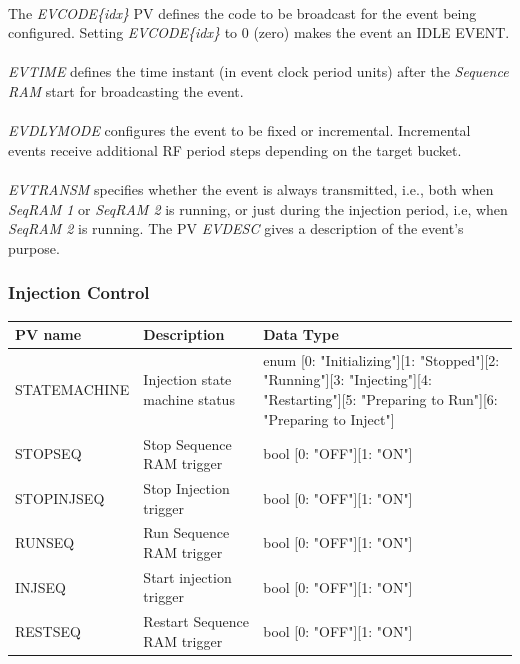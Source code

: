\documentclass[openany]{article}
\begin{document}
			\paragraph{} The \emph{EVCODE\{idx\}} PV defines the code to be broadcast for the event being configured. Setting \emph{EVCODE\{idx\}} to 0 (zero) makes the event an IDLE EVENT.
			\paragraph{} \emph{EVTIME} defines the time instant (in event clock period units) after the \emph{Sequence RAM} start for broadcasting the event.
			\paragraph{} \emph{EVDLYMODE} configures the event to be fixed or incremental. Incremental events receive additional RF period steps depending on the target bucket.
			\paragraph{} \emph{EVTRANSM} specifies whether the event is always transmitted, i.e., both when \emph{SeqRAM 1} or \emph{SeqRAM 2} is running, or just during the injection period, i.e, when \emph{SeqRAM 2} is running. The PV \emph{EVDESC} gives a description of the event's purpose.

		\subsubsection{Injection Control}\label{pvgroup:evg-injection}
			\begin{center}
			\begin{tabular}{| m{2.8cm} m{6cm} m{6cm} |}
			    \hline
			    \bfseries PV name & \bfseries Description & \bfseries Data Type \\ \hline
			    STATEMACHINE & Injection state machine status & enum [0: "Initializing"][1: "Stopped"][2: "Running"][3: "Injecting"][4: "Restarting"][5: "Preparing to Run"][6: "Preparing to Inject"] \\ \hline
			    STOPSEQ & Stop Sequence RAM trigger & bool [0: "OFF"][1: "ON"] \\ \hline
			    STOPINJSEQ & Stop Injection trigger & bool [0: "OFF"][1: "ON"] \\ \hline
			    RUNSEQ & Run Sequence RAM trigger & bool [0: "OFF"][1: "ON"] \\ \hline
			    INJSEQ & Start injection trigger & bool [0: "OFF"][1: "ON"] \\ \hline
			    RESTSEQ & Restart Sequence RAM trigger & bool [0: "OFF"][1: "ON"] \\ \hline
			\end{tabular}
			\end{center}
\end{document}
